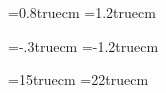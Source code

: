 %
\baselineskip=0.8truecm
\parindent=1.2truecm



\headheight=12pt
\footskip=48pt
\hoffset=-.3truecm          %
\voffset=-1.2truecm

\textwidth=15truecm
\textheight=22truecm


\setcounter{page}{0}

\tableofcontents  
{}









